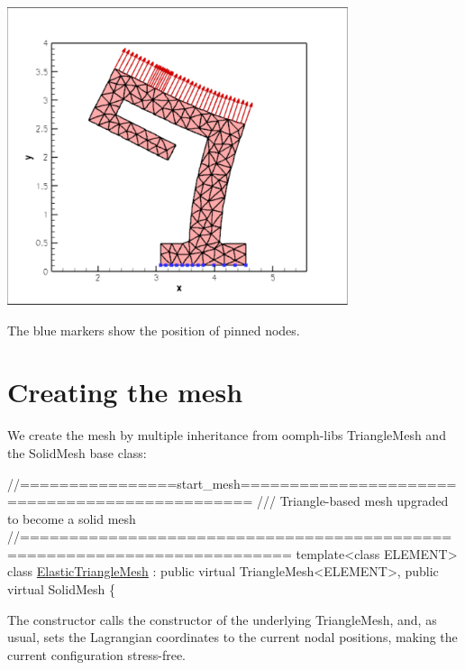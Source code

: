  
\begin{DoxyImage}
\includegraphics[width=0.75\textwidth]{two_d}
\end{DoxyImage}


The blue markers show the position of pinned nodes.



 

\hypertarget{index_mesh_code}{}\section{Creating the mesh}\label{index_mesh_code}
We create the mesh by multiple inheritance from {\ttfamily oomph-\/lib\textquotesingle{}s} {\ttfamily Triangle\+Mesh} and the {\ttfamily Solid\+Mesh} base class\+:

 
\begin{DoxyCodeInclude}
\textcolor{comment}{//================start\_mesh===============================================}
\textcolor{comment}{/// Triangle-based mesh upgraded to become a solid mesh}
\textcolor{comment}{}\textcolor{comment}{//=========================================================================}
\textcolor{keyword}{template}<\textcolor{keyword}{class} ELEMENT>
\textcolor{keyword}{class }\hyperlink{classElasticTriangleMesh}{ElasticTriangleMesh} : \textcolor{keyword}{public} \textcolor{keyword}{virtual} TriangleMesh<ELEMENT>, 
                            \textcolor{keyword}{public} \textcolor{keyword}{virtual} SolidMesh 
\{

\end{DoxyCodeInclude}


The constructor calls the constructor of the underlying {\ttfamily Triangle\+Mesh}, and, as usual, sets the Lagrangian coordinates to the current nodal positions, making the current configuration stress-\/free.


